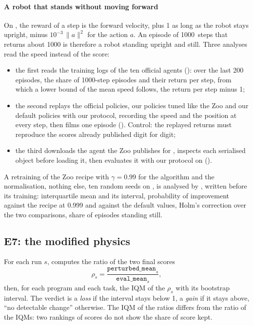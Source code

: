 \paragraph{A robot that stands without moving forward}
On , the reward of a step is the forward velocity, plus 1 as long as the robot stays upright,
minus $10^{-3}\,\lVert a\rVert^2$ for the action $a$. An episode of \num{1000}~steps that returns about
\num{1000} is therefore a robot standing upright and still. Three analyses read the speed instead of the score:
\begin{itemize}
  \item the first reads the training logs of the ten official agents ():
    over the last 200 episodes, the share of \num{1000}-step episodes and their return per step, from which a
    lower bound of the mean speed follows, the return per step minus 1;
  \item the second replays the official policies, our policies tuned like the Zoo and our default
    policies with our protocol, recording the speed and the position at every step, then films one episode
    (). Control: the replayed returns must reproduce the scores already
    published digit for digit;
  \item the third downloads the agent the Zoo publishes for , inspects each serialised
    object before loading it, then evaluates it with our protocol on 
    ().
\end{itemize}
A retraining of the Zoo recipe with $\gamma=0.99$ for the algorithm and the normalisation, nothing else,
ten random seeds on , is analysed by , written before its
training: interquartile mean and its interval, probability of improvement against the recipe at 0.999 and
against the default values, Holm's correction over the two comparisons, share of episodes standing still.

\subsection{E7: the modified physics}\label{sec:plan-e7}
For each run $s$,  computes the ratio of the two final scores
\begin{equation}\label{eq:e7}
  \rho_s=\frac{\texttt{perturbed\_mean}_s}{\texttt{eval\_mean}_s},
\end{equation}
then, for each program and each task, the IQM of the $\rho_s$ with its bootstrap interval. The verdict is a
\emph{loss} if the interval stays below 1, a \emph{gain} if it stays above, \enquote{no detectable change}
otherwise. The IQM of the ratios differs from the ratio of the IQMs: two rankings of scores do not show the
share of score kept.

